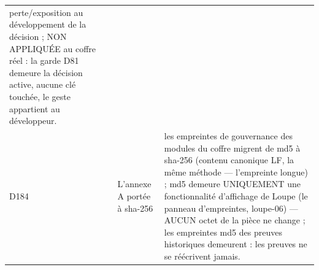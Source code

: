 \begin{longtable}{@{}p{1.6cm} p{4.6cm} >{\raggedright\arraybackslash}p{9.5cm}@{}}
perte/exposition au développement de la décision ; NON APPLIQUÉE au coffre
réel : la garde D81 demeure la décision active, aucune clé touchée, le
geste appartient au développeur. \\
D184 & L'annexe A portée à sha-256 & les empreintes de gouvernance des
modules du coffre migrent de md5 à sha-256 (contenu canonique LF, la même
méthode — l'empreinte longue) ; md5 demeure UNIQUEMENT une fonctionnalité
d'affichage de Loupe (le panneau d'empreintes, loupe-06) — AUCUN octet de
la pièce ne change ; les empreintes md5 des preuves historiques demeurent
: les preuves ne se réécrivent jamais. \\
\end{longtable}